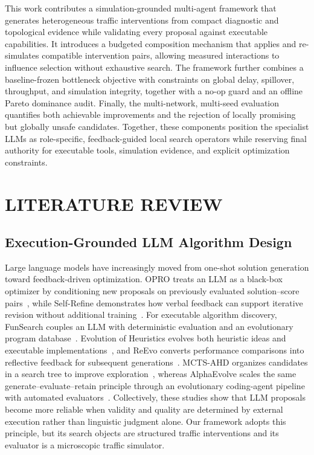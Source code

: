 \documentclass{trbunofficial}
\begin{document}
This work contributes a simulation-grounded multi-agent framework that generates
heterogeneous traffic interventions from compact diagnostic and topological
evidence while validating every proposal against executable capabilities.  It
introduces a budgeted composition mechanism that applies and re-simulates
compatible intervention pairs, allowing measured interactions to influence
selection without exhaustive search.  The framework further combines a
baseline-frozen bottleneck objective with constraints on global delay,
spillover, throughput, and simulation integrity, together with a no-op guard
and an offline Pareto dominance audit.  Finally, the multi-network, multi-seed
evaluation quantifies both achievable improvements and the rejection of locally
promising but globally unsafe candidates.  Together, these components position
the specialist LLMs as role-specific, feedback-guided local search operators
while reserving final authority for executable tools, simulation evidence, and
explicit optimization constraints.

\section{LITERATURE REVIEW}

\subsection{Execution-Grounded LLM Algorithm Design}

Large language models have increasingly moved from one-shot solution
generation toward feedback-driven optimization. OPRO treats an LLM as a
black-box optimizer by conditioning new proposals on previously evaluated
solution--score pairs~\cite{yang2024opro}, while Self-Refine demonstrates how
verbal feedback can support iterative revision without additional
training~\cite{madaan2023selfrefine}. For executable algorithm discovery,
FunSearch couples an LLM with deterministic evaluation and an evolutionary
program database~\cite{romera2024funsearch}. Evolution of Heuristics evolves
both heuristic ideas and executable implementations~\cite{liu2024eoh}, and
ReEvo converts performance comparisons into reflective feedback for subsequent
generations~\cite{ye2024reevo}. MCTS-AHD organizes candidates in a search tree
to improve exploration~\cite{zheng2025mctsahd}, whereas AlphaEvolve scales the
same generate--evaluate--retain principle through an evolutionary coding-agent
pipeline with automated evaluators~\cite{novikov2025alphaevolve}. Collectively,
these studies show that LLM proposals become more reliable when validity and
quality are determined by external execution rather than linguistic judgment
alone. Our framework adopts this principle, but its search objects are
structured traffic interventions and its evaluator is a microscopic traffic
simulator.
\end{document}
